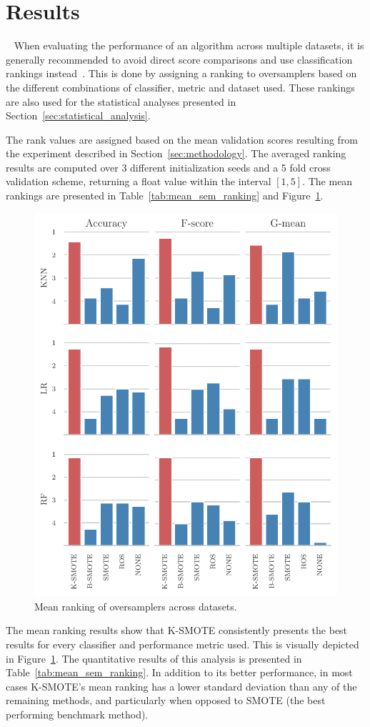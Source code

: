 \documentclass[parskip=full]{scrartcl}
\begin{document}
\section{Results}~\label{sec:results}
When evaluating the performance of an algorithm across multiple datasets, it is generally
recommended to avoid direct score comparisons and use classification rankings
instead~\cite{demvsar2006}. This is done by assigning a ranking to oversamplers based on the
different combinations of classifier, metric and dataset used. These rankings are also used for the
statistical analyses presented in Section~\ref{sec:statistical_analysis}.

The rank values are assigned based on the mean validation scores resulting from the experiment
described in Section~\ref{sec:methodology}. The averaged ranking results are computed over 3
different initialization seeds and a 5 fold cross validation scheme, returning a float value within
the interval $[1,5]$. The mean rankings are presented in Table~\ref{tab:mean_sem_ranking} and
Figure~\ref{fig:mean_rankings_bar_chart}.

\begin{figure}[H]
	\centering
	\includegraphics[width=.6\linewidth]{../analysis/mean_rankings_bar_chart}
	\caption{Mean ranking of oversamplers across datasets.
    }\label{fig:mean_rankings_bar_chart}
\end{figure}

The mean ranking results show that K-SMOTE consistently presents the best results for every
classifier and performance metric used. This is visually depicted in
Figure~\ref{fig:mean_rankings_bar_chart}. The quantitative results of this analysis is presented in
Table~\ref{tab:mean_sem_ranking}. In addition to its better performance, in most cases K-SMOTE's
mean ranking has a lower standard deviation than any of the remaining methods, and particularly when
opposed to SMOTE (the best performing benchmark method).
\end{document}
